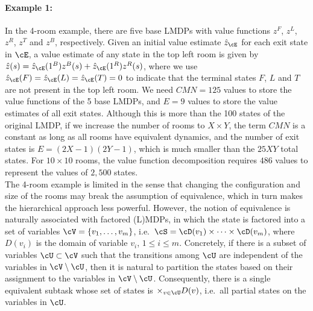 \paragraph{Example 1:} %
In the 4-room example, there are five base LMDPs with value functions $z^F$, $z^L$, $z^R$, $z^T$ and $z^B$, respectively. Given an initial value estimate $\hat{z}_\cE$ for each exit state in $\cE$, a value estimate of any state in the top left room is given by $\hat{z}(s)=\hat{z}_\cE(1^B) z^B(s) + \hat{z}_\cE(1^R) z^R(s)$, where we use $\hat{z}_\cE(F)=\hat{z}_\cE(L)=\hat{z}_\cE(T)=0$ to indicate that the terminal states $F$, $L$ and $T$ are not present in the top left room. We need $CMN = 125$ values to store the value functions of the 5 base LMDPs, and $E=9$ values to store the value estimates of all exit states. Although this is more than the 100 states of the original LMDP, if we increase the number of rooms to $X\times Y$, the term $CMN$ is a constant as long as all rooms have equivalent dynamics, and the number of exit states is $E=(2X-1)(2Y-1)$, which is much smaller than the $25XY$ total states. For $10\times 10$ rooms, the value function decomposition requires $486$ values to represent the values of $2{,}500$ states.\\

The 4-room example is limited in the sense that changing the configuration and size of the rooms may break the assumption of equivalence, which in turn makes the hierarchical approach less powerful. However, the notion of equivalence is naturally associated with factored (L)MDPs, in which the state is factored into a set of variables $\cV=\{v_1,\ldots,v_m\}$, i.e.~$\cS=\cD(v_1)\times\cdots\times\cD(v_m)$, where $D(v_i)$ is the domain of variable $v_i$, $1\leq i\leq m$.
Concretely, if there is a subset of variables $\cU\subset\cV$ such that the transitions among $\cU$ are independent of the variables in $\cV\setminus\cU$, then it is natural to partition the states based on their assignment to the variables in $\cV\setminus\cU$. Consequently, there is a single equivalent subtask whose set of states is $\times_{v\in\cU}D(v)$, i.e.~all partial states on the variables in $\cU$.

